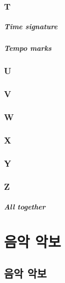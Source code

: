 \documentclass[12pt, a4paper, oneside]{book}
\let\stdsection\section
\renewcommand\section{\newpage\stdsection}
\begin{document}
	\subsection{T}



\paragraph{Time signature}

\paragraph{Tempo marks}

	\subsection{U}

	\subsection{V}

	\subsection{W}

	\subsection{X}

	\subsection{Y}

	\subsection{Z}








\paragraph{All together}





	\chapter{음악 악보}
	\noptcrule
	\parttoc				

	\section{음악 악보}




\end{document}
